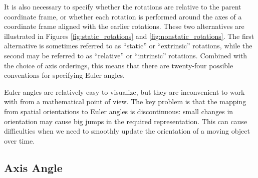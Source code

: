It is also necessary to specify whether the rotations are relative to
the parent coordinate frame, or whether each rotation is performed
around the axes of a coordinate frame aligned with the earlier
rotations.  These two alternatives are illustrated in Figures
\ref{fig:static_rotations} and \ref{fig:nonstatic_rotations}.  The
first alternative is sometimes referred to as ``static'' or
``extrinsic'' rotations, while the second may be referred to as
``relative'' or ``intrinsic'' rotations.  Combined with the choice of
axis orderings, this means that there are twenty-four possible
conventions for specifying Euler angles.

Euler angles are relatively easy to visualize, but they are
inconvenient to work with from a mathematical point of view.  The key
problem is that the mapping from spatial orientations to Euler angles
is discontinuous: small changes in orientation may cause big jumps in
the required representation.  This can cause difficulties when we need
to smoothly update the orientation of a moving object over time.

\subsection{Axis Angle}


